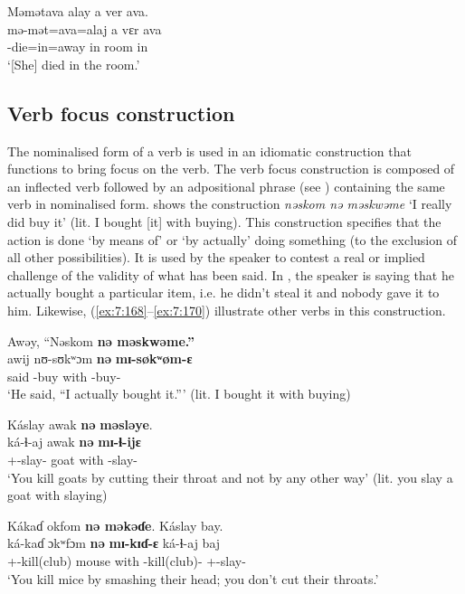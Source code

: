 \ea\label{ex:7:166}
Məmətava  alay  a  ver  ava.\\
\gll  mə-mət=ava=alaj    a   vɛr   ava\\
      {\NOM}{}-die=in=away    in  room  in\\
\glt  ‘[She] died in the room.’ \\
\z 

\subsection{Verb focus construction}\label{sec:7.6.3}
\hypertarget{RefHeading1212461525720847}{}
The nominalised form of a verb is used in an idiomatic construction that functions to bring focus on the verb. The verb focus construction is composed of an inflected verb followed by an adpositional phrase (see ) containing the same verb in nominalised form.  shows the construction \textit{nəskom  nə məskwəme} ‘I really did buy it’ (lit. I bought [it] with buying). This construction specifies that the action is done ‘by means of’ or ‘by actually’ doing something (to the exclusion of all other possibilities).  It is used by the speaker to contest a real or implied challenge of the validity of what has been said. In , the speaker is saying that he actually bought a particular item, i.e. he didn’t steal it and nobody gave it to him. Likewise, (\ref{ex:7:168}--\ref{ex:7:170}) illustrate other verbs in this construction. 

\ea \label{ex:7:167}
Awəy,  “Nəskom \textbf{nə  məskwəme.”}\\
\gll awij   nʊ-sʊkʷɔm \textbf{nə}   \textbf{mɪ-søkʷøm-ɛ}\\
     said  {\oneS}-buy    with  {\NOM}{}-buy-{\CL}\\
\glt ‘He said, “I actually bought it.”’ (lit. I bought it with buying) 
\z

\ea \label{ex:7:168}
Káslay  awak \textbf{nə} \textbf{məsləye}.\\
\gll ká-ɬ{}-aj awak \textbf{nə} \textbf{mɪ-ɬ{}-ijɛ}\\
{\twoS}+{\IFV}-slay{}-{\CL}  goat  with  {\NOM}{}-slay-{\CL}\\
\glt ‘You kill goats by cutting their throat and not by any other way’ (lit. you slay a goat with slaying)
\z

\ea \label{ex:7:169}
Kákaɗ  okfom \textbf{nə  məkəɗe}.  Káslay  bay.\\
\gll ká-kaɗ  ɔkʷfɔm \textbf{nə}  \textbf{mɪ-kɪɗ-ɛ} ká-ɬ{}-aj    baj\\
{\twoS}+{\IFV}-kill(club)  mouse  with  {\NOM}{}-kill(club)-{\CL}  {\twoS}+{\IFV}-slay-{\CL}  {\NEG}\\
\glt ‘You kill mice by smashing their head; you don’t cut their throats.’  
\z

